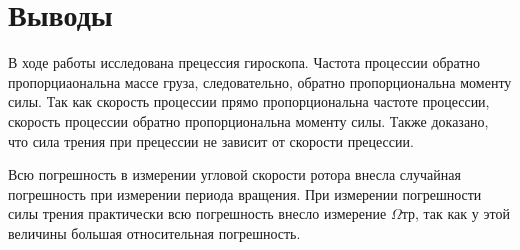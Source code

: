 \section{Выводы}

В ходе работы исследована прецессия гироскопа. Частота процессии
обратно пропорциаональна массе груза, следовательно, обратно
пропорциональна моменту силы. Так как скорость процессии прямо
пропорциональна частоте процессии, скорость процессии обратно
пропорциональна моменту силы. Также доказано, что сила трения при
прецессии не зависит от скорости прецессии.

Всю погрешность в измерении угловой скорости ротора внесла
случайная погрешность при измерении периода вращения. При измерении
погрешности силы трения практически всю погрешность внесло измерение
$\Omega\text{тр}$, так как у этой величины большая относительная
погрешность.

